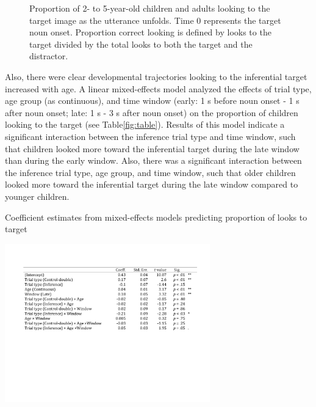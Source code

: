 \documentclass[10pt,letterpaper]{article}
\begin{document}
\begin{figure}[t]
	\caption{\label{fig:age} Proportion of 2- to 5-year-old children and adults looking to the target image as the utterance unfolds. Time 0 represents the target noun onset. Proportion correct looking is defined by looks to the target divided by the total looks to both the target and the distractor.}
\end{figure}

 Also, there were clear developmental trajectories looking to the inferential target increased with age. A linear mixed-effects model analyzed the effects of trial type, age group (as continuous), and time window (early: 1 s before noun onset - 1 s after noun onset;  late: 1 s - 3 s after noun onset) on the proportion of children looking to the target (see Table\ref{fig:table}). Results of this model indicate a significant interaction between the inference trial type and time window, such that children looked more toward the inferential target during the late window than during the early window. Also, there was a significant interaction between the inference trial type, age group, and time window, such that older children looked more toward the inferential target during the late window compared to younger children.

\begin{table}
\begin{center} 
\caption{\label{fig:table} Coefficient estimates from mixed-effects models predicting proportion of looks to target}
\includegraphics[width=3.5in]{figures/table.pdf}
\end{center} 
\end{table}
\end{document}
